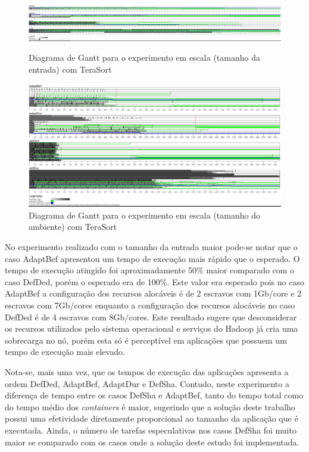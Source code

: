 \begin{figure}
    \centering
	\includegraphics[width=1\textwidth]{figuras/TS-esc-ent.png}
    \caption{Diagrama de Gantt para o experimento em escala (tamanho da entrada) com TeraSort}
	\label{fig:exp3TS}

	\includegraphics[width=1\textwidth]{figuras/TS-esc-amb.png}
    \caption{Diagrama de Gantt para o experimento em escala (tamanho do ambiente) com TeraSort}
	\label{fig:exp31TS}	
\end{figure}

No experimento realizado com o tamanho da entrada maior pode-se notar que o caso AdaptBef apresentou um tempo de execução mais rápido que o esperado. O tempo de execução atingido foi aproximadamente 50\% maior comparado com o caso DefDed, porém o esperado era de 100\%. Este valor era esperado pois no caso AdaptBef a configuração dos recursos alocáveis é de 2 escravos com 1Gb/core e 2 escravos com 7Gb/cores enquanto a configuração dos recursos alocáveis no caso DefDed é de 4 escravos com 8Gb/cores. Este resultado sugere que desconsiderar os recursos utilizados pelo sistema operacional e serviços do Hadoop já cria uma sobrecarga no nó, porém esta só é perceptível em aplicações que possuem um tempo de execução mais elevado. 

Nota-se, mais uma vez, que os tempos de execução das aplicações apresenta a ordem DefDed, AdaptBef, AdaptDur e DefSha. Contudo, neste experimento a diferença de tempo entre os casos DefSha e AdaptBef, tanto do tempo total como do tempo médio dos \textit{containers} é maior, sugerindo que a solução deste trabalho possui uma efetividade diretamente proporcional ao tamanho da aplicação que é executada. Ainda, o número de tarefas especulativas nos casos DefSha foi muito maior se comparado com os casos onde a solução deste estudo foi implementada.

